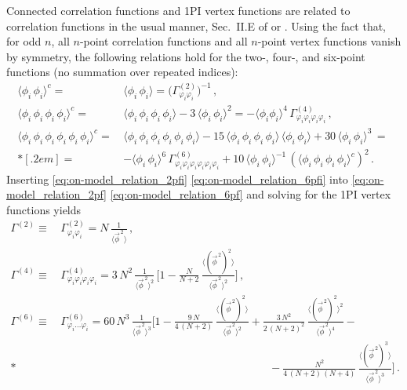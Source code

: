 Connected correlation functions and 1PI vertex functions are related to correlation functions in the usual manner, \cf{} Sec.~II.E of  or .
Using the fact that, for odd $n$, all $n$-point correlation functions and all $n$-point \ipi{} vertex functions vanish by symmetry, the following relations hold for the two-, four-, and six-point functions (no summation over repeated indices):
\begin{align}
	\langle \phi_i \, \phi_i \rangle^{c} = \, & \langle \phi_i \, \phi_i \rangle = \big( \Gamma^{(2)}_{\varphi_i\varphi_i} \big)^{-1} \, ,	\label{eq:on-model_relation_2pf}
	\\[.2em]
	\langle \phi_i \, \phi_i \, \phi_i \, \phi_i \rangle^{c} = \, & \langle \phi_i \, \phi_i \, \phi_i \, \phi_i \rangle - 3 \, \langle \phi_i \, \phi_i \rangle^2 = - \langle \phi_i \phi_i \rangle^4 \, \Gamma^{(4)}_{\varphi_i \varphi_i \varphi_i \varphi_i} \, ,\label{eq:on-model_relation_4pf}
	\\[.2em]
	\langle \phi_i \, \phi_i \, \phi_i \, \phi_i \, \phi_i \, \phi_i \rangle^{c} = \, & \langle \phi_i \, \phi_i \, \phi_i \, \phi_i \, \phi_i \, \phi_i \rangle -	15 \, \langle \phi_i \, \phi_i \, \phi_i \, \phi_i \rangle \, \langle \phi_i \, \phi_i \rangle + 30 \, \langle \phi_i \, \phi_i \rangle^3 \,=\,	\nonumber
	\\*[.2em] %
	= \, & - \langle \phi_i \, \phi_i \rangle^6 \, \Gamma^{(6)}_{\varphi_i \varphi_i \varphi_i \varphi_i \varphi_i \varphi_i} + 10 \, \langle \phi_i \, \phi_i \rangle^{-1} \, ( \langle \phi_i \, \phi_i \, \phi_i \, \phi_i \rangle^{c} )^2 \, . \label{eq:on-model_relation_6pf}
\end{align}
Inserting \cref{eq:on-model_relation_2pfi} \dash{} \eqref{eq:on-model_relation_6pfi} into \cref{eq:on-model_relation_2pf} \dash{} \eqref{eq:on-model_relation_6pf} and solving for the 1PI vertex functions yields
\begin{align}
	\Gamma^{(2)} \equiv \, & \Gamma^{(2)}_{\varphi_i \varphi_i} = N \, \frac{1}{ \langle \vec{\phi}^{\, 2} \rangle} \, ,	\label{eq:on-model_relation_2pf_phi2}
	\\
	\Gamma^{(4)} \equiv \, & \Gamma^{(4)}_{\varphi_i \varphi_i \varphi_i \varphi_i} = 3 \, N^2 \, \frac{1}{\langle \vec{\phi}^{\, 2} \rangle^2} \, \bigg[ 1 - \frac{N}{N + 2} \, \frac{\langle ( \vec{\phi}^{\, 2} )^2 \rangle}{\langle \vec{\phi}^{\, 2} \rangle^2} \bigg] \, ,	\label{eq:on-model_relation_4pf_phi2}
	\\
	\Gamma^{(6)} \equiv \, & \Gamma^{(6)}_{\varphi_i \ldots \varphi_i} = 60 \, N^3 \, \frac{1}{ \langle \vec{\phi}^{\, 2} \rangle^3} \bigg[ 1 - \frac{9 \, N}{ 4 \, ( N + 2 )} \, \frac{\langle ( \vec{\phi}^{\, 2} )^2 \rangle}{\langle \vec{\phi}^{\, 2} \rangle^2} +\frac{3 \, N^2}{2 \, ( N + 2 )^2} \, \frac{\langle ( \vec{\phi}^{\, 2} )^2 \rangle^2}{\langle \vec{\phi}^{\, 2} \rangle^4} - \nonumber\\* %
	&\qquad\qquad\qquad\qquad\qquad\qquad\qquad\qquad\qquad\quad- \frac{N^2}{4 \, ( N + 2 ) \, ( N + 4 )} \, \frac{\langle ( \vec{\phi}^{\, 2} )^3 \rangle}{\langle \vec{\phi}^{\, 2} \rangle^3} \bigg] \, .	\label{eq:on-model_relation_6pf_phi2}
\end{align}

